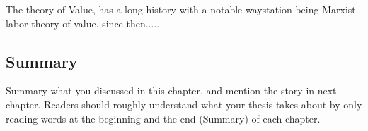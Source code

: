 The theory of Value, has a long history with a notable waystation being Marxist labor theory of value. since then.....

\subsection{Summary}
Summary what you discussed in this chapter, and mention the story in next
chapter. Readers should roughly understand what your thesis takes about by only reading
words at the beginning and the end (Summary) of each chapter.




